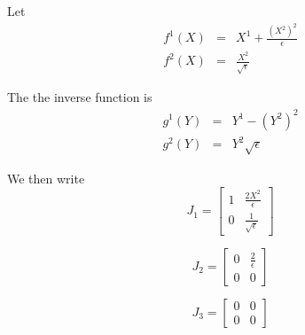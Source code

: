\documentclass[12pt]{article}
\begin{document}
Let
\begin{eqnarray}
f^1(X) &=& X^1 + \frac{\left( X^2 \right)^2}{\epsilon} \\
f^2(X) &=& \frac{X^2}{\sqrt{\epsilon}}
\end{eqnarray}

The the inverse function is
\begin{eqnarray}
g^1(Y) &=& Y^1 - \left( Y^2 \right)^2 \\
g^2(Y) &=& Y^2 \sqrt{\epsilon}
\end{eqnarray}


We then write
\begin{equation}
J_1 = \begin{bmatrix}
1 & \frac{2X^2}{\epsilon} \\
0 & \frac{1}{\sqrt{\epsilon}}
\end{bmatrix}
\end{equation}

\begin{equation}
J_2 = \begin{bmatrix}
0 & \frac{2}{\epsilon} \\
0 & 0
\end{bmatrix}
\end{equation}

\begin{equation}
J_3 = \begin{bmatrix}
0 & 0 \\
0 & 0
\end{bmatrix}
\end{equation}
\end{document}
